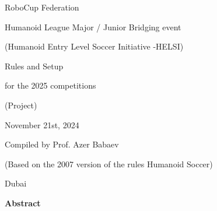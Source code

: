 \documentclass[a4paper]{article}
\begin{document}
\normalsize
{\centering
RoboCup Federation
\par}


\bigskip


\bigskip

{\centering
Humanoid League Major / Junior Bridging event
\par}


\bigskip

{\centering
(Humanoid Entry Level Soccer Initiative -HELSI)
\par}


\bigskip


\bigskip

{\centering
Rules and Setup
\par}

{\centering
for the 2025 competitions
\par}

{\centering
(Project)
\par}


\bigskip


\bigskip


\bigskip


\bigskip


\bigskip


\bigskip

{\centering
November 21st, 2024
\par}

{\centering
Compiled by Prof. Azer Babaev
\par}

{\centering
(Based on the 2007 version of the rules Humanoid Soccer)
\par}

{\centering
Dubai
\par}


\bigskip


\bigskip


\bigskip


\bigskip


\bigskip


\bigskip


\bigskip
\newpage

{\centering
\textbf{Abstract}
\par}
\end{document}
